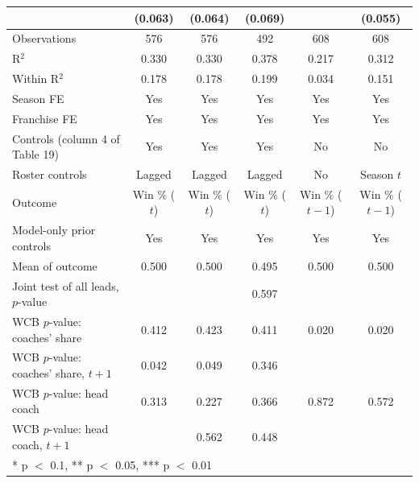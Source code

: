 \begin{table}[H]
{\begin{tabular}[t]{lccccc}
 & (0.063) & (0.064) & (0.069) &  & (0.055)\\
\midrule
Observations & 576 & 576 & 492 & 608 & 608\\
R$^2$ & 0.330 & 0.330 & 0.378 & 0.217 & 0.312\\
Within R$^2$ & 0.178 & 0.178 & 0.199 & 0.034 & 0.151\\
Season FE & Yes & Yes & Yes & Yes & Yes\\
Franchise FE & Yes & Yes & Yes & Yes & Yes\\
Controls (column 4 of Table 19) & Yes & Yes & Yes & No & No\\
Roster controls & Lagged & Lagged & Lagged & No & Season $t$\\
Outcome & Win \% ($t$) & Win \% ($t$) & Win \% ($t$) & Win \% ($t-1$) & Win \% ($t-1$)\\
Model-only prior controls & Yes & Yes & Yes & Yes & Yes\\
Mean of outcome & 0.500 & 0.500 & 0.495 & 0.500 & 0.500\\
Joint test of all leads, $p$-value &  &  & 0.597 &  & \\
WCB $p$-value: coaches' share & 0.412 & 0.423 & 0.411 & 0.020 & 0.020\\
WCB $p$-value: coaches' share, $t+1$ & 0.042 & 0.049 & 0.346 &  & \\
WCB $p$-value: head coach & 0.313 & 0.227 & 0.366 & 0.872 & 0.572\\
WCB $p$-value: head coach, $t+1$ &  & 0.562 & 0.448 &  & \\
\bottomrule
\multicolumn{6}{l}{\rule{0pt}{1em}* p $<$ 0.1, ** p $<$ 0.05, *** p $<$ 0.01}\\
\end{tabular}}
\end{table}

